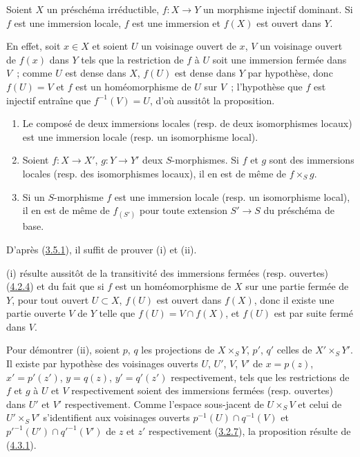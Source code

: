 \begin{proposition}[4.5.4]
\label{I.4.5.4-fr}
Soient $X$ un préschéma irréductible, $f:X\to Y$ un morphisme injectif
dominant. Si $f$ est une immersion locale, $f$ est une immersion et $f(X)$
est ouvert dans $Y$.
\end{proposition}

En effet, soit $x\in X$ et soient $U$ un voisinage ouvert de $x$, $V$ un
voisinage ouvert de $f(x)$ dans $Y$ tels que la restriction de $f$ à $U$
soit une immersion fermée dans $V$~; comme $U$ est dense dans $X$, $f(U)$
est dense dans $Y$ par hypothèse, donc $f(U)=V$ et $f$ est un homéomorphisme
de $U$ sur $V$~; l'hypothèse que $f$ est injectif entraîne que
$f^{-1}(V)=U$, d'où aussitôt la proposition.

\begin{proposition}[4.5.5]
\label{I.4.5.5-fr}
\begin{enumerate}
  \item[\rm(i)] Le composé de deux immersions locales (resp. de deux
    isomorphismes locaux) est une immersion locale (resp. un isomorphisme
    local).
  \item[\rm(ii)] Soient $f:X\to X'$, $g:Y\to Y'$ deux $S$-morphismes. Si
    $f$ et $g$ sont des immersions locales (resp. des isomorphismes locaux),
    il en est de même de $f\times_S g$.
  \item[\rm(iii)] Si un $S$-morphisme $f$ est une immersion locale (resp. un
    isomorphisme local), il en est de même de $f_{(S')}$ pour toute extension
    $S'\to S$ du préschéma de base.
\end{enumerate}
\end{proposition}

D'après (\hyperref[I.3.5.1-fr]{3.5.1}), il suffit de prouver (i) et (ii).

(i) résulte aussitôt de la transitivité des immersions fermées (resp.
ouvertes) (\hyperref[I.4.2.4-fr]{4.2.4}) et du fait que si $f$ est un
homéomorphisme de $X$ sur une partie fermée de $Y$, pour tout ouvert
$U\subset X$, $f(U)$ est ouvert dans $f(X)$, donc il existe une partie
ouverte $V$ de $Y$ telle que $f(U)=V\cap f(X)$, et $f(U)$ est par suite fermé
dans $V$.

Pour démontrer (ii), soient $p$, $q$ les projections de $X\times_S Y$, $p'$,
$q'$ celles de $X'\times_S Y'$. Il existe par hypothèse des voisinages
ouverts $U$, $U'$, $V$, $V'$ de $x=p(z)$, $x'=p'(z')$, $y=q(z)$,
$y'=q'(z')$ respectivement, tels que les restrictions de $f$ et $g$ à $U$
et $V$ respectivement soient des immersions fermées (resp. ouvertes) dans
$U'$ et $V'$ respectivement. Comme l'espace sous-jacent de $U\times_S V$ et
celui de $U'\times_S V'$ s'identifient aux voisinages ouverts
$p^{-1}(U)\cap q^{-1}(V)$ et ${p'}^{-1}(U')\cap{q'}^{-1}(V')$ de $z$ et
$z'$ respectivement (\hyperref[I.3.2.7-fr]{3.2.7}), la proposition résulte
de (\hyperref[I.4.3.1-fr]{4.3.1}).
